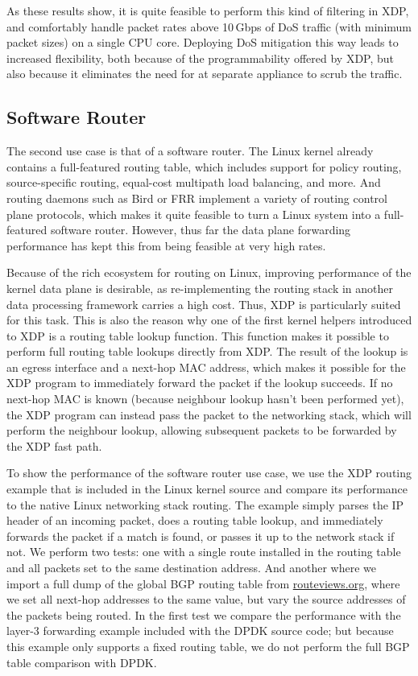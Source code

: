 \documentclass[10pt,sigconf]{acmart}
\begin{document}
As these results show, it is quite feasible to perform this kind of filtering in
XDP, and comfortably handle packet rates above 10\,Gbps of DoS traffic (with
minimum packet sizes) on a single CPU core. Deploying DoS mitigation this way
leads to increased flexibility, both because of the programmability offered by
XDP, but also because it eliminates the need for at separate appliance to scrub
the traffic.

\subsection{Software Router}
\label{sec:fwd-usecase}
The second use case is that of a software router. The Linux kernel already
contains a full-featured routing table, which includes support for policy
routing, source-specific routing, equal-cost multipath load balancing, and more.
And routing daemons such as Bird or FRR implement a variety of routing control
plane protocols, which makes it quite feasible to turn a Linux system into a
full-featured software router. However, thus far the data plane forwarding
performance has kept this from being feasible at very high rates.

Because of the rich ecosystem for routing on Linux, improving performance of the
kernel data plane is desirable, as re-implementing the routing stack in another
data processing framework carries a high cost. Thus, XDP is particularly suited
for this task. This is also the reason why one of the first kernel helpers
introduced to XDP is a routing table lookup function. This function makes it
possible to perform full routing table lookups directly from XDP. The result of
the lookup is an egress interface and a next-hop MAC address, which makes it
possible for the XDP program to immediately forward the packet if the lookup
succeeds. If no next-hop MAC is known (because neighbour lookup hasn't been
performed yet), the XDP program can instead pass the packet to the networking
stack, which will perform the neighbour lookup, allowing subsequent packets to
be forwarded by the XDP fast path.

To show the performance of the software router use case, we use the XDP routing
example that is included in the Linux kernel source and compare its performance
to the native Linux networking stack routing. The example simply parses the IP
header of an incoming packet, does a routing table lookup, and immediately
forwards the packet if a match is found, or passes it up to the network stack if
not. We perform two tests: one with a single route installed in the routing
table and all packets set to the same destination address. And another where we
import a full dump of the global BGP routing table from \url{routeviews.org},
where we set all next-hop addresses to the same value, but vary the source
addresses of the packets being routed. In the first test we compare the
performance with the layer-3 forwarding example included with the DPDK source
code; but because this example only supports a fixed routing table, we do not
perform the full BGP table comparison with DPDK.
\end{document}
